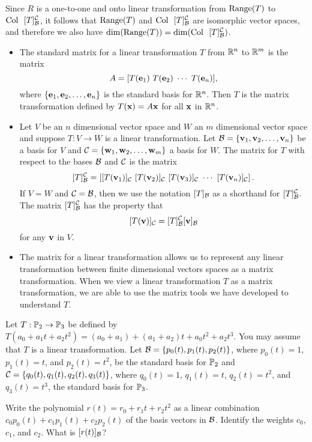 \begin{example}
 
 	\item Since $R$ is a one-to-one and onto linear transformation from $\text{Range}(T)$ to $\text{Col } \ [T]_{\mathcal{B}}^{\mathcal{C}}$, it follows that $\text{Range}(T)$ and $\text{Col } \ [T]_{\mathcal{B}}^{\mathcal{C}}$ are isomorphic vector spaces, and therefore we also have $\dim(\Range(T)) = \dim(\Col \ [T]_{\CB}^{\CC})$.
	
\ea


\end{example}

 
\begin{itemize}
\item The standard matrix for a linear transformation $T$ from $\mathbb{R}^n$ to $\mathbb{R}^m$ is the matrix 
\[A = [T(\ve_1) \ T(\ve_2) \ \cdots \ T(\ve_n)],\]
where $\{\mathbf{e}_1, \mathbf{e}_2, \ldots, \mathbf{e}_n\}$ is the standard basis for $\mathbb{R}^n$. Then $T$ is the matrix transformation defined by $T(\mathbf{x}) = A\mathbf{x}$ for all $\mathbf{x}$ in $\mathbb{R}^n$. 
\item Let $V$ be an $n$ dimensional vector space and $W$ an $m$ dimensional vector space and suppose $T : V \to W$ is a linear transformation. Let $\mathcal{B} = \{\mathbf{v}_1, \mathbf{v}_2, \ldots, \mathbf{v}_n\}$ be a basis for $V$ and $\mathcal{C} = \{\mathbf{w}_1, \mathbf{w}_2, \ldots, \mathbf{w}_m\}$ a basis for $W$. The matrix for $T$ with respect to the bases $\mathcal{B}$ and $\mathcal{C}$ is the matrix  
\[[T]_{\CB}^{\CC} = \left[  [T(\vv_1)]_{\CC}  \ [T(\vv_2)]_{\CC}  \ [T(\vv_3)]_{\CC}  \ \cdots  \ [T(\vv_n)]_{\CC} \right].\] 
If $V=W$ and $\mathcal{C} = \mathcal{B}$, then we use the notation $[T]_{\mathcal{B}}$ as a shorthand for $[T]_{\mathcal{B}}^{\mathcal{C}}$. The matrix $[T]_{\mathcal{B}}^{\mathcal{C}} $ has the property that
\[[T(\mathbf{v})]_{\mathcal{C}} = [T]_{\mathcal{B}}^{\mathcal{C}} [\mathbf{v}]_{\mathcal{B}}\]
for any $\mathbf{v}$ in $V$. 
\item The matrix for a linear transformation allows us to represent any linear transformation between finite dimensional vectors spaces as a matrix transformation. When we view a linear transformation $T$ as a matrix transformation, we are able to use the matrix tools we have developed to understand $T$.
\end{itemize}

\be
\item  \label{ex:8_b_matrix_transformation} Let $T : \mathbb{P}_2 \to \mathbb{P}_3$ be defined by $T(a_0+a_1t+a_2t^2) = (a_0+a_1) + (a_1+a_2)t + a_0t^2 + a_2t^3$. You may assume that $T$ is a linear transformation. Let $\mathcal{B} = \{p_0(t), p_1(t), p_2(t)\}$, where $p_0(t)=1$, $p_1(t)=t$, and $p_2(t) = t^2$, be the standard basis for $\mathbb{P}_2$ and $\mathcal{C}=\{q_0(t), q_1(t), q_2(t), q_3(t)\}$, where $q_0(t) = 1$, $q_1(t) = t$, $q_2(t)=t^2$, and $q_3(t)=t^3$, the standard basis for $\mathbb{P}_3$.
	\ba
	\item Write the polynomial $r(t) = r_0+r_1t+r_2t^2$ as a linear combination $c_0p_0(t)+c_1p_1(t)+c_2p_2(t)$ of the basis vectors in $\mathcal{B}$. Identify the weights $c_0$, $c_1$, and $c_2$. What is $[r(t)]_{\mathcal{B}}$?
	

